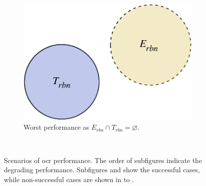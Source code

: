 \begin{figure}[p]
\begin{subfigure}[b]{0.475\textwidth}
  \end{subfigure}
  \hspace{\fill} 
  \bigskip
  \\
  \begin{subfigure}[b]{0.475\textwidth}
    \includegraphics[width=\textwidth]{images/evaluation/set_explain/T_mutually_exclusive_E}
    \caption{Worst performance as $E_{rbn} \cap T_{rbn} = \varnothing$.}
    \label{fig:evaluation:metrics:character_rec:sets:worst}
  \end{subfigure}
  \bigskip
  \\
  \caption[Euler diagram to illustrate OCR performance]{Scenarios of \gls{ocr} performance. The order of subfigures indicate the degrading performance. Subfigures  and  show the successful cases, while non-successful cases are shown in  to . }
  \label{fig:evaluation:metrics:character_rec:sets}
\end{figure}